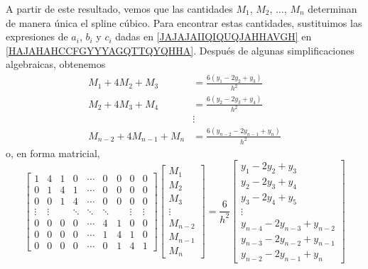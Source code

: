 \newpage

A partir de este resultado, vemos que las cantidades $M_1$, $M_2$, $\dots$, $M_n$ determinan de manera única el spline cúbico. Para encontrar estas cantidades, sustituimos las expresiones de $a_i$, $b_i$ y $c_i$ dadas en \eqref{JAJAJAIIQIQUQJAHHAVGH} en \eqref{HAJAHAHCCFGYYYAGQTTQYQHHA}. Después de algunas simplificaciones algebraicas, obtenemos
\begin{equation}
    \begin{aligned}
        M_1 + 4M_2 + M_3 & = \frac{6(y_1 - 2y_2 + y_3)}{h^2} \\
        M_2 + 4M_3 + M_4 & = \frac{6(y_2 - 2y_3 + y_4)}{h^2} \\
        & \vdots \\
        M_{n-2} + 4M_{n-1} + M_n & = \frac{6(y_{n-2} - 2y_{n-1} + y_n)}{h^2}
    \end{aligned} \label{JAJAHAGYATTQTTFFFQTTTTQ}
\end{equation}
o, en forma matricial,
$$\begin{bmatrix}
    1 & 4 & 1 & 0 & \cdots & 0 & 0 & 0 & 0 \\
    0 & 1 & 4 & 1 & \cdots & 0 & 0 & 0 & 0 \\
    0 & 0 & 1 & 4 & \cdots & 0 & 0 & 0 & 0 \\
    \vdots & \vdots & & \ddots & \ddots & \ddots & & \vdots & \vdots \\
    0 & 0 & 0 & 0 & \cdots & 4 & 1 & 0 & 0 \\
    0 & 0 & 0 & 0 & \cdots & 1 & 4 & 1 & 0 \\
    0 & 0 & 0 & 0 & \cdots & 0 & 1 & 4 & 1
\end{bmatrix} \begin{bmatrix}
    M_1 \\
    M_2 \\
    M_3 \\
    \vdots \\
    M_{n-2} \\
    M_{n-1} \\
    M_n
\end{bmatrix} = \frac{6}{h^2} \begin{bmatrix}
    y_1 - 2y_2 + y_3 \\
    y_2 - 2y_3 + y_4 \\
    y_3 - 2y_4 + y_5 \\
    \vdots \\
    y_{n-4} - 2y_{n-3} + y_{n-2} \\
    y_{n-3} - 2y_{n-2} + y_{n-1} \\
    y_{n-2} - 2y_{n-1} + y_n
\end{bmatrix}$$
